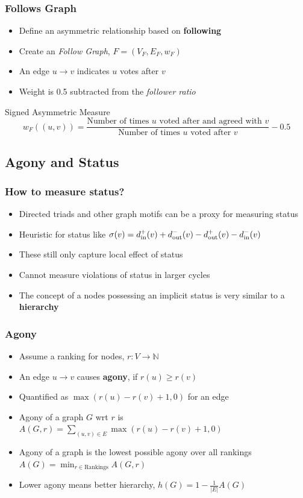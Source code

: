 \documentclass{beamer}
\begin{document}
\begin{frame}
    \frametitle{Follows Graph}
    \begin{itemize}
        \item Define an asymmetric relationship based on \textbf{following} 
        \item Create an \textit{Follow Graph}, $F=(V_F,E_F,w_F)$
        \item An edge $u \rightarrow v$ indicates $u$ votes after $v$
        \item Weight is 0.5 subtracted from the \textit{follower ratio}
    \end{itemize}
    \begin{block}{Signed Asymmetric Measure}
        $$ w_{F}((u,v)) = \frac{\text{Number of times } u \text{ voted after and agreed with } v }{\text{Number of times } u \text{ voted after } v} -0.5$$
    \end{block}

\end{frame}


\subsection{Agony and Status}

\begin{frame}
    \frametitle{How to measure status?}
    \begin{itemize}
        \item Directed triads and other graph motifs can be a proxy for measuring status \cite{Liu2019LinkPrediction}
        \item Heuristic for status like  $\sigma(v) = d_{\text{in}}^{+}(v) + d_{\text{out}}^{-}(v) - d_{\text{out}}^{+}(v)- d_{\text{in}}^{-}(v)$ \cite{leskovec2010predicting}
        \item These still only capture local effect of status
        \item Cannot measure violations of status in larger cycles
        \item The concept of a nodes possessing an implicit status is very similar to a \textbf{hierarchy} 
    \end{itemize}
\end{frame}

\begin{frame}
    \frametitle{Agony}
    \begin{itemize}
        \item Assume a ranking for nodes, $r:V\rightarrow \mathbb{N}$
        \item An edge $u \rightarrow v$ causes \textbf{agony}, if $r(u)\geq r(v)$
        \item Quantified as $\max(r(u)-r(v)+1,0)$ for an edge
        \item Agony of a graph $G$ wrt $r$ is $A(G,r) =  \sum_{(u,v)\in E} \max(r(u)-r(v)+1,0)$
        \item Agony of a graph is the lowest possible agony over all rankings $A(G) = \min_{r\in \text{Rankings}}A(G,r)$
        \item Lower agony means better hierarchy, $h(G)=1-\frac{1}{|E|}A(G)$
    \end{itemize}
\end{frame}
\end{document}
